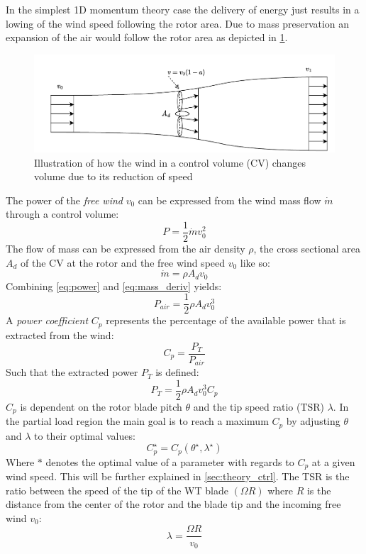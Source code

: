 In the simplest 1D momentum theory case the delivery of energy just results in a lowing of the wind speed following the rotor area. Due to mass preservation an expansion of the air would follow the rotor area as depicted in \cref{fig:betz}.
\begin{figure}[ht]
	\centering
	\includegraphics[width=0.8\linewidth]{Graphics/FlowThroughRotor.pdf}
	\caption{Illustration of how the wind in a control volume (CV) changes volume due to its reduction of speed}
	\label{fig:betz}
\end{figure}
The power of the \textit{free wind} $ v_0 $ can be expressed from the wind mass flow $ \dot{m} $ through a control volume:
\begin{equation} \label{eq:power}
	P = \dfrac{1}{2} \dot{m} v_0^2
\end{equation}
The flow of mass can be expressed from the air density $ \rho $, the cross sectional area $ A_d $ of the CV at the rotor and the free wind speed $ v_0 $ like so:
\begin{equation}\label{eq:mass_deriv}
	\dot{m} = \rho A_d v_0
\end{equation}
Combining \cref{eq:power} and \cref{eq:mass_deriv} yields:
\begin{equation}\label{eq:power2}
	P_{air} = \dfrac{1}{2} \rho A_d v_0^3
\end{equation}
A \textit{power coefficient} $ C_p $ represents the percentage of the available power that is extracted from the wind:
\begin{equation}\label{eq:Cp}
	C_p = \dfrac{P_T}{P_{air}}
\end{equation}
Such that the extracted power $ P_T $ is defined:
\begin{equation}\label{eq:power_w_Cp}
	P_{T} = \dfrac{1}{2} \rho A_d v_0^3 C_p
\end{equation}
$ C_p $ is dependent on the rotor blade pitch $ \theta $ and the tip speed ratio (TSR) $ \lambda $. In the partial load region the main goal is to reach a maximum $ C_p $ by adjusting $ \theta $ and  $ \lambda $ to their optimal values:
\begin{equation}\label{eq:cp_optimal}
	C_p^\star = C_p(\theta^\star, \lambda^\star)
\end{equation}
Where $ * $ denotes the optimal value of a parameter with regards to $ C_p $ at a given wind speed. This will be further explained in \cref{sec:theory_ctrl}. The TSR is the ratio between the speed of the tip of the WT blade $ (\Omega R) $ where $ R $ is the distance from the center of the rotor and the blade tip and the incoming free wind $v_0$:
\begin{equation}\label{eq:tipspeedratio}
	\lambda = \dfrac{\Omega R}{v_0}
\end{equation}

